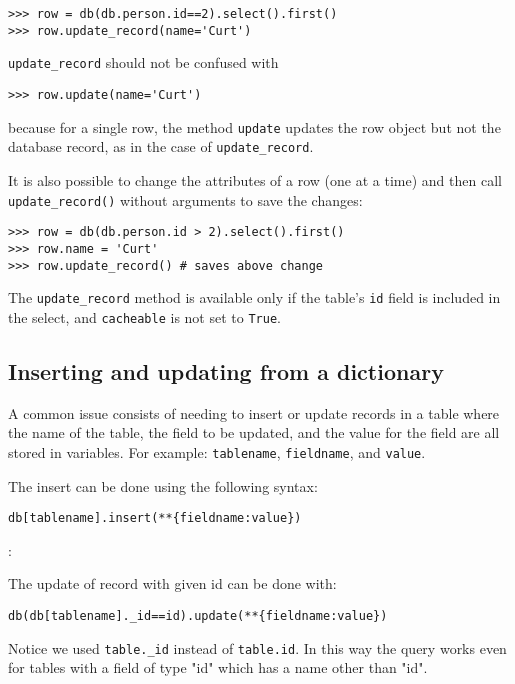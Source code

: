 \documentclass[justified,sixbynine,notoc]{tufte-book}
\def\ft{\small\tt}
\def\inxx#1{\index{#1}}
\begin{document}
\begin{fullwidth}
\begin{lstlisting}
>>> row = db(db.person.id==2).select().first()
>>> row.update_record(name='Curt')
\end{lstlisting}

{\ft update\_record} should not be confused with

\begin{lstlisting}
>>> row.update(name='Curt')
\end{lstlisting}
\noindent because for a single row, the method {\ft update} updates the row object but not the database record, as in the case of {\ft update\_record}.

It is also possible to change the attributes of a row (one at a time) and then call {\ft update\_record()} without arguments to save the changes:

\begin{lstlisting}
>>> row = db(db.person.id > 2).select().first()
>>> row.name = 'Curt'
>>> row.update_record() # saves above change
\end{lstlisting}

The {\ft update\_record} method is available only if the table's {\ft id} field is included in the select, and {\ft cacheable} is not set to {\ft True}.

\goodbreak\subsection{Inserting and updating from a dictionary}

A common issue consists of needing to insert or update records in a table where the name of the table, the field to be updated, and the value for the field are all stored in variables. For example: {\ft tablename}, {\ft fieldname}, and {\ft value}.

The insert can be done using the following syntax:

\begin{lstlisting}
db[tablename].insert(**{fieldname:value})
\end{lstlisting}:

The update of record with given id can be done with: \inxx{\_id}

\begin{lstlisting}
db(db[tablename]._id==id).update(**{fieldname:value})
\end{lstlisting}

Notice we used {\ft table.\_id} instead of {\ft table.id}. In this way the query works even for tables with a field of type "id" which has a name other than "id".


\end{fullwidth}
\end{document}

